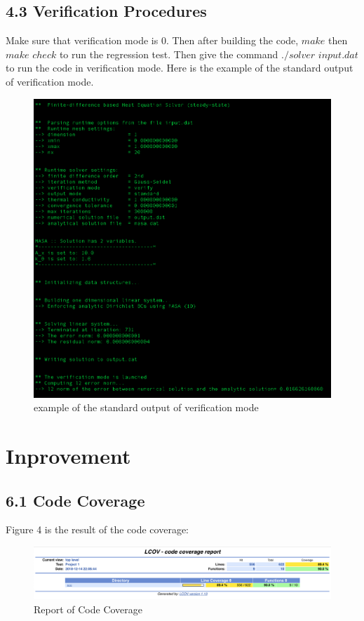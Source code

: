 \documentclass{article}
\begin{document}
\subsection*{4.3 Verification Procedures}
Make sure that verification mode is 0. Then after building the code, $make$ then $make$ $check$ to run the regression test. Then give the command $./solver$ $input.dat$ to run the code in verification mode. Here is the example of the standard output of verification mode.
\newpage
\begin{figure}[h!]
  \includegraphics[width=\linewidth]{figure_3}
  \caption{example of the standard output of verification mode}
\end{figure}

\section{Inprovement}

\subsection*{6.1 Code Coverage}
Figure 4 is the result of the code coverage:
\begin{figure}[h!]
  \includegraphics[width=15cm]{figure_13}
  \caption{Report of Code Coverage}
\end{figure}
\end{document}
